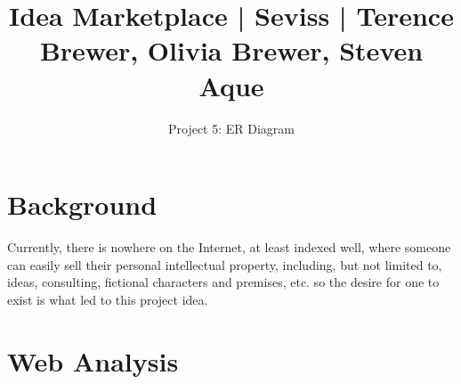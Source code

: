 \documentclass[]{article}
\title{Idea Marketplace | Seviss | Terence Brewer, Olivia Brewer, Steven Aque}
\author{Project 5: ER Diagram}
\begin{document}
\maketitle

\section{Background}
	Currently, there is nowhere on the Internet, at least indexed well, where someone can easily sell their personal intellectual property, including, but not limited to, ideas, consulting, fictional characters and premises, etc. so the desire for one to exist is what led to this project idea.
\section{Web Analysis}
\end{document}
